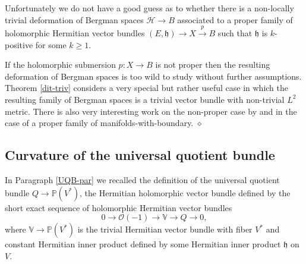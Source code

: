 \documentclass[12pt,hidelinks]{amsart}
\newcommand{\cO}{{\mathcal O}}
\newcommand{\sH}{{\mathscr H}}
\newcommand{\fh}{{\mathfrak h}}
\newcommand{\bbP}{{\mathbb P}}
\newcommand{\bbV}{{\mathbb V}}
\newcommand{\red}{\hfill $\diamond$}
\begin{document}
Unfortunately we do not have a good guess as to whether there is a non-locally trivial deformation of Bergman spaces $\sH \to B$ associated to a proper family of holomorphic Hermitian vector bundles $(E, \fh) \to X \stackrel{p}{\to} B$ such that $\fh$ is $k$-positive for some $k \ge 1$.

\begin{rmk}
If the holomorphic submersion $p :X \to B$ is not proper then the resulting deformation of Bergman spaces is too wild to study without further assumptions.  Theorem \ref{dit-triv} considers a very special but rather useful case in which the resulting family of Bergman spaces is a trivial vector bundle with non-trivial $L^2$ metric.  There is also very interesting work on the non-proper case by \cite{wang} and \cite{pranav} in the case of a proper family of manifolds-with-boundary.
\red
\end{rmk}

\subsection{Curvature of the universal quotient bundle}

In Paragraph \ref{UQB-par} we recalled the definition of the universal quotient bundle $Q \to \bbP(V^*)$, the Hermitian holomorphic vector bundle defined by the short exact sequence of holomorphic Hermitian vector bundles 
\[
0 \to \cO (-1) \to \bbV \to Q \to 0,
\]
where $\bbV \to \bbP(V^*)$ is the trivial Hermitian vector bundle with fiber $V^*$ and constant Hermitian inner product defined by some Hermitian inner product $\fh$ on $V$.  
\end{document}
